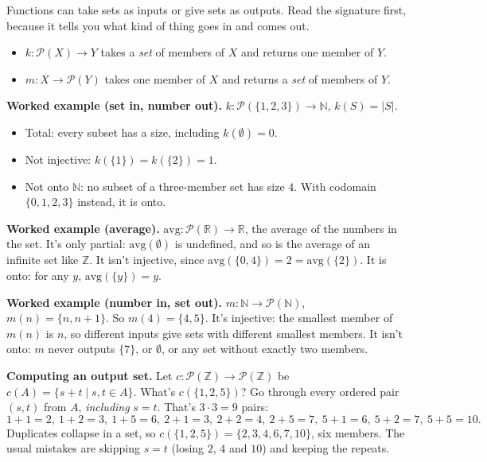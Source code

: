 Functions can take sets as inputs or give sets as outputs. Read the signature first, because it tells you what kind of thing goes in and comes out.
\begin{itemize}
\item $k:\mathcal{P}(X)\to Y$ takes a \emph{set} of members of $X$ and returns one member of $Y$.
\item $m:X\to\mathcal{P}(Y)$ takes one member of $X$ and returns a \emph{set} of members of $Y$.
\end{itemize}

\textbf{Worked example (set in, number out).} $k:\mathcal{P}(\{1,2,3\})\to\mathbb{N}$, $k(S)=|S|$.
\begin{itemize}
\item Total: every subset has a size, including $k(\emptyset)=0$.
\item Not injective: $k(\{1\})=k(\{2\})=1$.
\item Not onto $\mathbb{N}$: no subset of a three-member set has size $4$. With codomain $\{0,1,2,3\}$ instead, it is onto.
\end{itemize}

\textbf{Worked example (average).} $\text{avg}:\mathcal{P}(\mathbb{R})\to\mathbb{R}$, the average of the numbers in the set. It's only partial: $\text{avg}(\emptyset)$ is undefined, and so is the average of an infinite set like $\mathbb{Z}$. It isn't injective, since $\text{avg}(\{0,4\})=2=\text{avg}(\{2\})$. It is onto: for any $y$, $\text{avg}(\{y\})=y$.

\textbf{Worked example (number in, set out).} $m:\mathbb{N}\to\mathcal{P}(\mathbb{N})$, $m(n)=\{n,n+1\}$. So $m(4)=\{4,5\}$. It's injective: the smallest member of $m(n)$ is $n$, so different inputs give sets with different smallest members. It isn't onto: $m$ never outputs $\{7\}$, or $\emptyset$, or any set without exactly two members.

\textbf{Computing an output set.} Let $c:\mathcal{P}(\mathbb{Z})\to\mathcal{P}(\mathbb{Z})$ be $c(A)=\{s+t\mid s,t\in A\}$. What's $c(\{1,2,5\})$? Go through every ordered pair $(s,t)$ from $A$, \emph{including} $s=t$. That's $3\cdot 3=9$ pairs:
\[
1{+}1=2,\ 1{+}2=3,\ 1{+}5=6,\ 2{+}1=3,\ 2{+}2=4,\ 2{+}5=7,\ 5{+}1=6,\ 5{+}2=7,\ 5{+}5=10.
\]
Duplicates collapse in a set, so $c(\{1,2,5\})=\{2,3,4,6,7,10\}$, six members. The usual mistakes are skipping $s=t$ (losing $2$, $4$ and $10$) and keeping the repeats.

